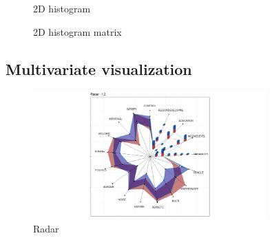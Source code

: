 \documentclass[article]{jss}
\begin{document}
\begin{figure}[htbp]
\centering
{}
\caption{\label{fig:2Dhist} 2D histogram }
\end{figure}


\begin{figure}[htbp]
\centering
{}
\caption{\label{fig:2DhistMatrix} 2D histogram matrix}
\end{figure}



\subsection{Multivariate visualization}

\begin{figure}[htbp]
\centering

\includegraphics[width=0.8\textwidth]{radar.pdf
}

\caption{\label{fig:radar} Radar}
\end{figure}


\end{document}
